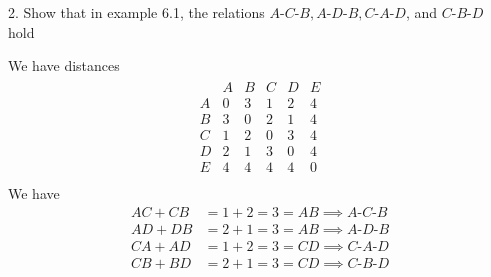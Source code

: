 \documentclass{report}
\begin{document}
    \pagebreak \bigbreak \noindent 
    \begin{mdframed}
        2. Show that in example 6.1, the relations $A\text{-}C\text{-}B, A\text{-}D\text{-}B, C\text{-}A\text{-}D$, and $C\text{-}B\text{-}D$ hold
    \end{mdframed}
    \bigbreak \noindent 
    We have distances
    \begin{align*}
        \begin{array}{c|ccccc}
           &A&B&C&D&E \\
            A&0 & 3 & 1 & 2 & 4 \\
            B& 3 & 0 & 2 & 1 & 4 \\
            C& 1 & 2 & 0 & 3 & 4 \\
            D& 2 & 1 &3 & 0 & 4\\
            E& 4 & 4 & 4 &4   & 0 \\
        \end{array}
    \end{align*}
    \bigbreak \noindent 
    We have
    \begin{align*}
        AC + CB &= 1 + 2 = 3 = AB \implies A\text{-}C\text{-}B \\
        AD + DB &= 2 + 1 = 3 = AB \implies A\text{-}D\text{-}B \\
        CA + AD &=1 + 2 =3 = CD \implies C\text{-}A\text{-}D \\
        CB + BD &= 2 + 1 = 3 = CD \implies C\text{-}B\text{-}D 
    \end{align*}
    \endpf
\end{document}

